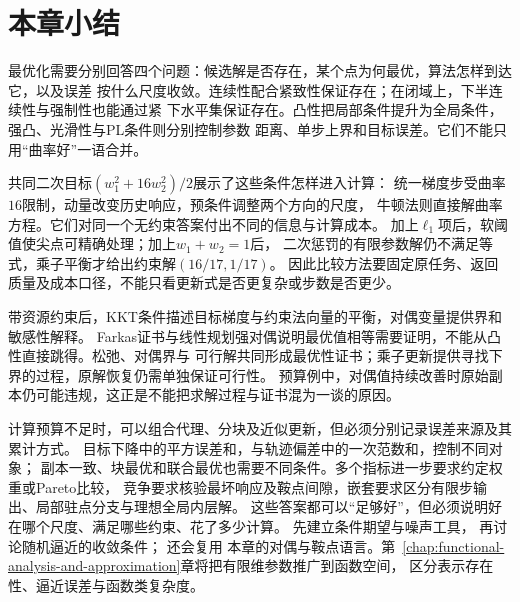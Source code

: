 \section{本章小结}
\label{sec:opt-summary}

最优化需要分别回答四个问题：候选解是否存在，某个点为何最优，算法怎样到达它，以及误差
按什么尺度收敛。连续性配合紧致性保证存在；在闭域上，下半连续性与强制性也能通过紧
下水平集保证存在。凸性把局部条件提升为全局条件，强凸、光滑性与PL条件则分别控制参数
距离、单步上界和目标误差。它们不能只用“曲率好”一语合并。

共同二次目标$(w_1^2+16w_2^2)/2$展示了这些条件怎样进入计算：
统一梯度步受曲率$16$限制，动量改变历史响应，预条件调整两个方向的尺度，
牛顿法则直接解曲率方程。它们对同一个无约束答案付出不同的信息与计算成本。
加上$\ell_1$项后，软阈值使尖点可精确处理；加上$w_1+w_2=1$后，
二次惩罚的有限参数解仍不满足等式，乘子平衡才给出约束解$(16/17,1/17)$。
因此比较方法要固定原任务、返回质量及成本口径，不能只看更新式是否更复杂或步数是否更少。

带资源约束后，KKT条件描述目标梯度与约束法向量的平衡，对偶变量提供界和敏感性解释。
Farkas证书与线性规划强对偶说明最优值相等需要证明，不能从凸性直接跳得。松弛、对偶界与
可行解共同形成最优性证书；乘子更新提供寻找下界的过程，原解恢复仍需单独保证可行性。
预算例中，对偶值持续改善时原始副本仍可能违规，这正是不能把求解过程与证书混为一谈的原因。

计算预算不足时，可以组合代理、分块及近似更新，但必须分别记录误差来源及其累计方式。
目标下降中的平方误差和，与轨迹偏差中的一次范数和，控制不同对象；
副本一致、块最优和联合最优也需要不同条件。多个指标进一步要求约定权重或Pareto比较，
竞争要求核验最坏响应及鞍点间隙，嵌套要求区分有限步输出、局部驻点分支与理想全局内层解。
这些答案都可以“足够好”，但必须说明好在哪个尺度、满足哪些约束、花了多少计算。
先建立条件期望与噪声工具，
再讨论随机逼近的收敛条件；
还会复用
本章的对偶与鞍点语言。第~\ref{chap:functional-analysis-and-approximation}章将把有限维参数推广到函数空间，
区分表示存在性、逼近误差与函数类复杂度。
